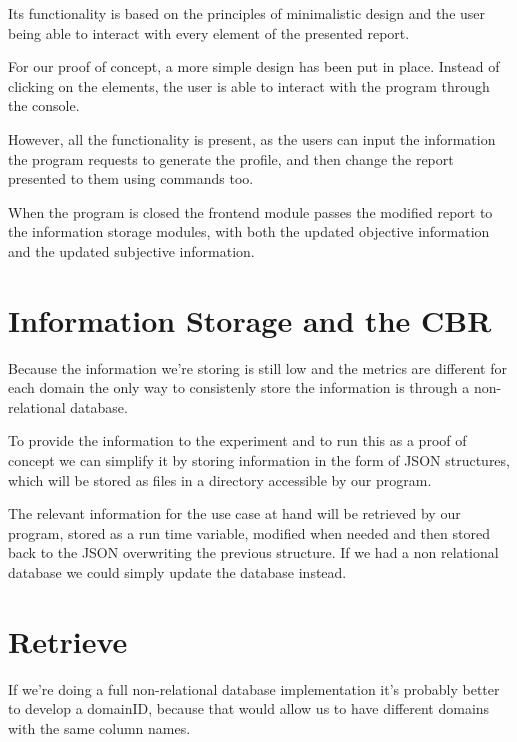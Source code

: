 Its functionality is based on the principles of minimalistic design and the user being able to interact with every element of the presented report.

For our proof of concept, a more simple design has been put in place. Instead of clicking on the elements, the user is able to interact with the program through the console.

However, all the functionality is present, as the users can input the information the program requests to generate the profile, and then change the report presented to them using commands too.

When the program is closed the frontend module passes the modified report to the information storage modules, with both the updated objective information and the updated subjective information.

\begin{figure}[!htb]
    \caption{\label{fig:feedback_loop}}
\end{figure}

\section{Information Storage and the CBR}
\label{cap6:sec:informationstorage}

Because the information we're storing is still low and the metrics are different for each domain the only way to consistenly store the information is through a non-relational database.

To provide the information to the experiment and to run this as a proof of concept we can simplify it by storing information in the form of JSON structures, which will be stored as files in a directory accessible by our program.

The relevant information for the use case at hand will be retrieved by our program, stored as a run time variable, modified when needed and then stored back to the JSON overwriting the previous structure.
If we had a non relational database we could simply update the database instead.

\section{Retrieve}
\label{cap6:sec:retrieve}
If we're doing a full non-relational database implementation it's probably better to develop a domainID, because that would allow us to have different domains with the same column names.

